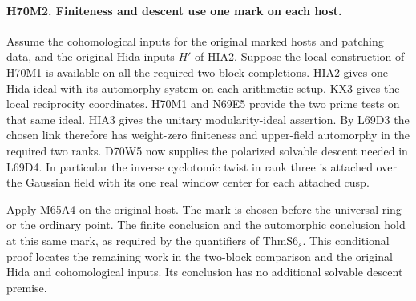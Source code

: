 \paragraph{H70M2. Finiteness and descent use one mark on each host.}
Assume the cohomological inputs for the original marked hosts and
patching data, and the original Hida inputs $H'$ of HIA2.
Suppose the local construction of H70M1 is available on all
the required two-block completions. HIA2 gives one Hida ideal
with its automorphy system on each arithmetic setup. KX3
gives the local reciprocity coordinates. H70M1 and N69E5
provide the two prime tests on that same ideal. HIA3 gives the
unitary modularity-ideal assertion. By L69D3 the chosen link
therefore has weight-zero finiteness and upper-field automorphy
in the required two ranks. D70W5 now supplies the polarized
solvable descent needed in L69D4. In particular the inverse
cyclotomic twist in rank three is attached over the Gaussian
field with its one real window center for each attached cusp.

Apply M65A4 on the original host. The mark is chosen before the
universal ring or the ordinary point. The finite conclusion and
the automorphic conclusion hold at this same mark, as required
by the quantifiers of $\mathrm{ThmS6}_s$. This conditional proof
locates the remaining work in the two-block comparison and the
original Hida and cohomological inputs. Its conclusion has no
additional solvable descent premise.
